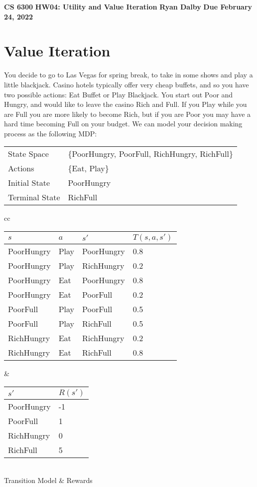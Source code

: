 \documentclass[12pt]{article}
\begin{document}
\begin{center}
{\bf CS 6300} \hfill {\large\bf HW04: Utility and Value Iteration} \hfill {\bf Ryan Dalby} \hfill {\bf Due February 24, 2022}
\end{center}

\section{Value Iteration}

You decide to go to Las Vegas for spring break, to take in some shows
and play a little blackjack.  Casino hotels typically offer very cheap
buffets, and so you have two possible actions: Eat Buffet or Play
Blackjack.  You start out Poor and Hungry, and would like to leave the
casino Rich and Full.  If you Play while you are Full you are more
likely to become Rich, but if you are Poor you may have a hard time
becoming Full on your budget.  We can model your decision making
process as the following MDP:

\begin{flushleft}
\begin{tabular}{ll}
State Space & \{PoorHungry, PoorFull, RichHungry, RichFull\}\\
Actions     & \{Eat, Play\} \\
Initial State &  PoorHungry \\
Terminal State & RichFull 
\end{tabular}
\end{flushleft}

\begin{center}
\begin{tabular}{cc}
\begin{tabular}{|l|l|l|l|} \hline
$s$        & $a$  & $s'$       & $T(s,a,s')$ \\ \hline
PoorHungry & Play & PoorHungry & 0.8 \\ \hline
PoorHungry & Play & RichHungry & 0.2 \\ \hline
PoorHungry & Eat  & PoorHungry & 0.8 \\ \hline
PoorHungry & Eat  & PoorFull   & 0.2 \\ \hline
PoorFull   & Play & PoorFull   & 0.5 \\ \hline
PoorFull   & Play & RichFull   & 0.5 \\ \hline
RichHungry & Eat  & RichHungry & 0.2 \\ \hline
RichHungry & Eat  &RichFull    & 0.8 \\ \hline
\end{tabular} &
\begin{tabular}{|l|l|}\hline
$s'$       & $R(s')$ \\ \hline
PoorHungry & -1 \\  \hline
PoorFull   &  1 \\ \hline
RichHungry &  0 \\ \hline
RichFull   &  5 \\ \hline
\end{tabular} \\
Transition Model & Rewards
\end{tabular}
\end{center}
\end{document}
